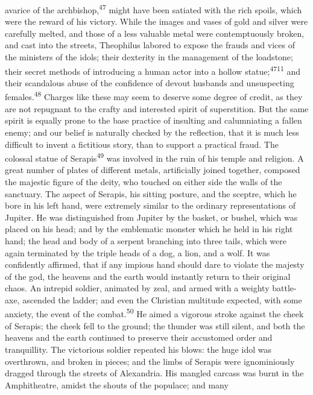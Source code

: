 avarice of the archbishop,\textsuperscript{47} might have been satiated with the
rich spoils, which were the reward of his victory. While the
images and vases of gold and silver were carefully melted, and
those of a less valuable metal were contemptuously broken, and
cast into the streets, Theophilus labored to expose the frauds
and vices of the ministers of the idols; their dexterity in the
management of the loadstone; their secret methods of introducing
a human actor into a hollow statue;\textsuperscript{4711} and their scandalous
abuse of the confidence of devout husbands and unsuspecting
females.\textsuperscript{48} Charges like these may seem to deserve some degree of
credit, as they are not repugnant to the crafty and interested
spirit of superstition. But the same spirit is equally prone to
the base practice of insulting and calumniating a fallen enemy;
and our belief is naturally checked by the reflection, that it is
much less difficult to invent a fictitious story, than to support
a practical fraud. The colossal statue of Serapis\textsuperscript{49} was involved
in the ruin of his temple and religion. A great number of plates
of different metals, artificially joined together, composed the
majestic figure of the deity, who touched on either side the
walls of the sanctuary. The aspect of Serapis, his sitting
posture, and the sceptre, which he bore in his left hand, were
extremely similar to the ordinary representations of Jupiter. He
was distinguished from Jupiter by the basket, or bushel, which
was placed on his head; and by the emblematic monster which he
held in his right hand; the head and body of a serpent branching
into three tails, which were again terminated by the triple heads
of a dog, a lion, and a wolf. It was confidently affirmed, that
if any impious hand should dare to violate the majesty of the
god, the heavens and the earth would instantly return to their
original chaos. An intrepid soldier, animated by zeal, and armed
with a weighty battle-axe, ascended the ladder; and even the
Christian multitude expected, with some anxiety, the event of the
combat.\textsuperscript{50} He aimed a vigorous stroke against the cheek of
Serapis; the cheek fell to the ground; the thunder was still
silent, and both the heavens and the earth continued to preserve
their accustomed order and tranquillity. The victorious soldier
repeated his blows: the huge idol was overthrown, and broken in
pieces; and the limbs of Serapis were ignominiously dragged
through the streets of Alexandria. His mangled carcass was burnt
in the Amphitheatre, amidst the shouts of the populace; and many
